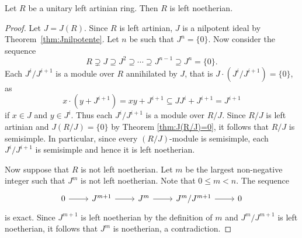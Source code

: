



\begin{theorem}
	\label{thm:Hopkins-Levitski}
	Let $R$ be a unitary left artinian ring. Then $R$ is left noetherian.
\end{theorem}

\begin{proof}
	Let $J=J(R)$. Since $R$ is left artinian, $J$ is a nilpotent ideal 
	by Theorem~\ref{thm:Jnilpotente}. Let $n$ be such that $J^n=\{0\}$. Now consider the sequence 
	\[
		R\supsetneq J\supseteq J^2\supseteq\cdots\supseteq J^{n-1}\supseteq J^n=\{0\}.
	\]
	Each $J^{i}/J^{i+1}$ is a module over $R$ annihilated by $J$, 
	that is $J\cdot (J^i/J^{i+1})=\{0\}$, as 
	\[
	x\cdot (y+J^{i+1})=xy+J^{i+1}\subseteq JJ^i+J^{i+1}=J^{i+1} 
	\]
	if $x\in J$ and $y\in J^i$. 
	Thus each  
	$J^i/J^{i+1}$ is a module over $R/J$. Since $R/J$ is left artinian and 
	$J(R/J)=\{0\}$ by Theorem \ref{thm:J(R/J)=0}, it follows that $R/J$ is semisimple. 
	In particular, since every $(R/J)$-module is semisimple,  
	each $J^{i}/J^{i+1}$ 
	is semisimple and hence it is left noetherian. 
	
	Now suppose that $R$ is not left noetherian. Let $m$ be the largest non-negative integer
	such that $J^m$ is not left noetherian. Note that $0\leq m<n$. The sequence
	\[
	 \begin{tikzcd}
        0 & J^{m+1} & J^m & J^{m}/J^{m+1} & 0
        \arrow[from=1-1, to=1-2]
        \arrow[from=1-2, to=1-3]
        \arrow[from=1-3, to=1-4]
        \arrow[from=1-4, to=1-5]
    \end{tikzcd}
	\]
	is exact. Since $J^{m+1}$ is left noetherian by the definition of $m$ 
	and $J^m/J^{m+1}$ is left noetherian, it follows that 
	$J^m$ is noetherian, a contradiction. 
\end{proof}

